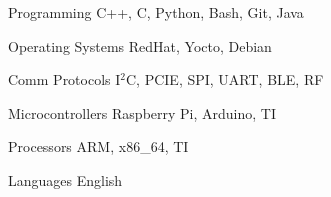 \vspace{-1.75mm}


\begin{cvskills}


\cvskill
{Programming} %
{C++, C, Python, Bash, Git, Java} %


\cvskill
{Operating Systems} %
{RedHat, Yocto, Debian} %


\cvskill
{Comm Protocols} %
{I$^2$C, PCIE, SPI, UART, BLE, RF} %


\cvskill
{Microcontrollers} %
{Raspberry Pi, Arduino, TI} %


\cvskill
{Processors} %
{ARM, x86\_64, TI} %

\cvskill
{Languages} %
{English} %


\end{cvskills}